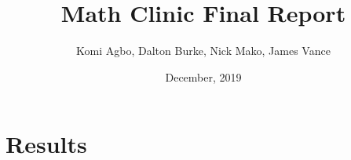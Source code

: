 \documentclass{article}
\title{Math Clinic Final Report}
\author{Komi Agbo, Dalton Burke, Nick Mako, James Vance}
\date{December, 2019}
\begin{document}
\maketitle
\newpage

\section{Results}
\end{document}
